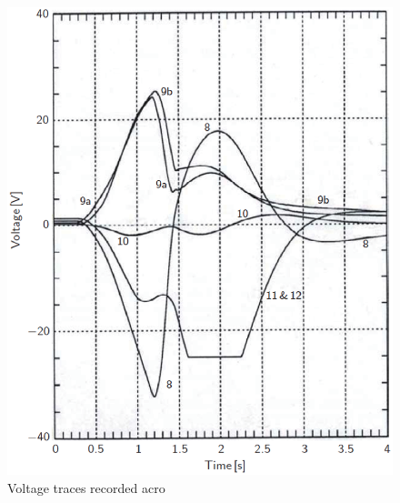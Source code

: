 \begin{figure}
	\centering
	\includegraphics[scale=0.6]{chpt8/figs/fig8.28.eps}
	\caption{Voltage traces recorded acro}
\end{figure}



